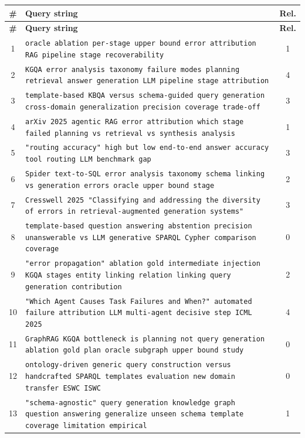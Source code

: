 \documentclass[11pt,a4paper]{article}
\begin{document}
\begin{center}
\footnotesize
\begin{longtable}{@{}c>{\RaggedRight}p{13.6cm}c@{}}
\toprule
\textbf{\#} & \textbf{Query string} & \textbf{Rel.} \\
\midrule
\endfirsthead
\toprule
\textbf{\#} & \textbf{Query string} & \textbf{Rel.} \\
\midrule
\endhead
1 & \texttt{oracle ablation per-stage upper bound error attribution RAG pipeline stage recoverability} & 1 \\
2 & \texttt{KGQA error analysis taxonomy failure modes planning retrieval answer generation LLM pipeline stage attribution} & 4 \\
3 & \texttt{template-based KBQA versus schema-guided query generation cross-domain generalization precision coverage trade-off} & 3 \\
4 & \texttt{arXiv 2025 agentic RAG error attribution which stage failed planning vs retrieval vs synthesis analysis} & 1 \\
5 & \texttt{"routing accuracy" high but low end-to-end answer accuracy tool routing LLM benchmark gap} & 3 \\
6 & \texttt{Spider text-to-SQL error analysis taxonomy schema linking vs generation errors oracle upper bound stage} & 2 \\
7 & \texttt{Cresswell 2025 "Classifying and addressing the diversity of errors in retrieval-augmented generation systems"} & 3 \\
8 & \texttt{template-based question answering abstention precision unanswerable vs LLM generative SPARQL Cypher comparison coverage} & 0 \\
9 & \texttt{"error propagation" ablation gold intermediate injection KGQA stages entity linking relation linking query generation contribution} & 2 \\
10 & \texttt{"Which Agent Causes Task Failures and When?" automated failure attribution LLM multi-agent decisive step ICML 2025} & 4 \\
11 & \texttt{GraphRAG KGQA bottleneck is planning not query generation ablation gold plan oracle subgraph upper bound study} & 0 \\
12 & \texttt{ontology-driven generic query construction versus handcrafted SPARQL templates evaluation new domain transfer ESWC ISWC} & 0 \\
13 & \texttt{"schema-agnostic" query generation knowledge graph question answering generalize unseen schema template coverage limitation empirical} & 1 \\

\end{longtable}
\end{center}
\end{document}
